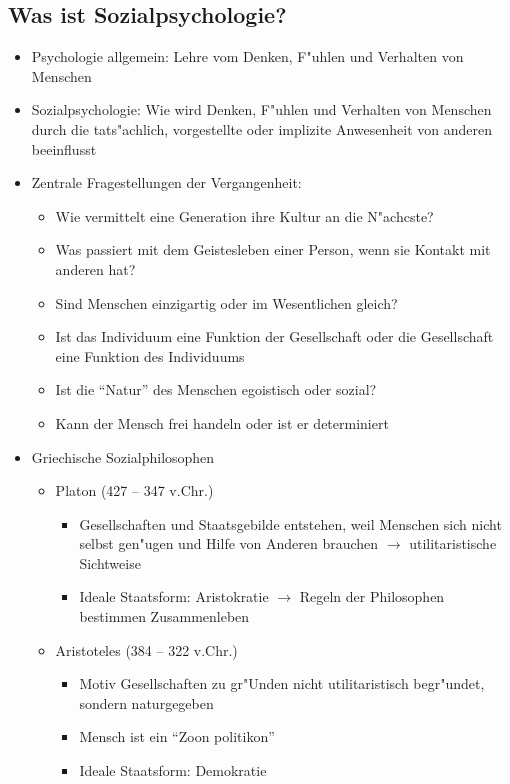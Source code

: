 \subsection{Was ist Sozialpsychologie?}
\begin{itemize}
	\item
		Psychologie allgemein: Lehre vom Denken, F"uhlen und Verhalten von Menschen
	\item
		Sozialpsychologie: Wie wird Denken, F"uhlen und Verhalten von Menschen durch die tats"achlich, vorgestellte oder implizite Anwesenheit von anderen beeinflusst
	\item
		Zentrale Fragestellungen der Vergangenheit:
		\begin{itemize}
			\item
				Wie vermittelt eine Generation ihre Kultur an die N"achcste?
			\item
				Was passiert mit dem Geistesleben einer Person, wenn sie Kontakt mit anderen hat?
			\item
				Sind Menschen einzigartig oder im Wesentlichen gleich?
			\item
				Ist das Individuum eine Funktion der Gesellschaft oder die Gesellschaft eine Funktion des Individuums
			\item
				Ist die \enquote{Natur} des Menschen egoistisch oder sozial?
			\item
				Kann der Mensch frei handeln oder ist er determiniert

		\end{itemize}

	\item
		Griechische Sozialphilosophen
		\begin{itemize}
			\item
				Platon (427 -- 347 v.Chr.)
				\begin{itemize}
					\item
						Gesellschaften und Staatsgebilde entstehen, weil Menschen sich nicht selbst gen"ugen und Hilfe von Anderen brauchen  $\rightarrow$  utilitaristische Sichtweise
					\item
						Ideale Staatsform: Aristokratie $\rightarrow$ Regeln der Philosophen bestimmen Zusammenleben
				\end{itemize}
			\item
				Aristoteles (384 -- 322 v.Chr.)
				\begin{itemize}
					\item
						Motiv Gesellschaften zu gr"Unden nicht utilitaristisch begr"undet, sondern naturgegeben
					\item
						Mensch ist ein \enquote{Zoon politikon}
					\item
						Ideale Staatsform: Demokratie
				\end{itemize}
		\end{itemize}


\end{itemize}
